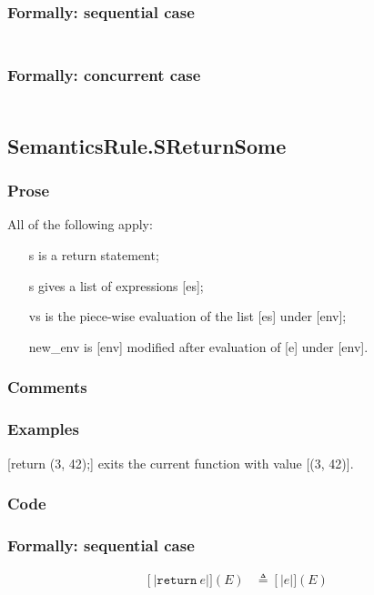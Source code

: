\documentclass{book}
\newcommand\syntt[1]{\mathtt{#1}}
\newcommand\llbracket{[|}
\newcommand\rrbracket{|]}
\newcommand\interp[1]{\left\llbracket #1 \right\rrbracket}
\begin{document}
  \subsubsection{Formally: sequential case}
  \begin{align}
  \end{align} 

  \subsubsection{Formally: concurrent case}
  \begin{align}
  \end{align} 

\subsection{SemanticsRule.SReturnSome \label{sec:SemanticsRule.SReturnSome}}

    \subsubsection{Prose}
    All of the following apply:
    \begin{itemize}
    \item [s] is a return statement;
    \item [s] gives a list of expressions [es];
    \item [vs] is the piece-wise evaluation of the list [es] under [env];
    \item [new\_env] is [env] modified after evaluation of [e] under [env].
    \end{itemize}

    \subsubsection{Comments}

    \subsubsection{Examples}
    [return (3, 42);] exits the current function with value [(3, 42)].

  \subsubsection{Code}

  \subsubsection{Formally: sequential case}
  \begin{align}
  \interp{\syntt{return}\ e} (E) & \triangleq \interp{e} (E)
  \label{eq:sem-det-sreturn}
  \end{align} 
\end{document}
